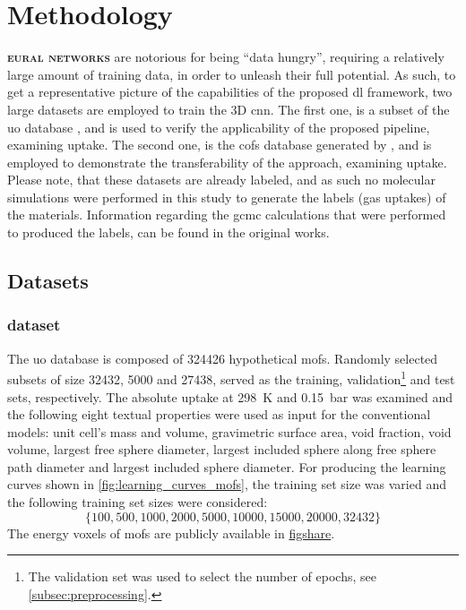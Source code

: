 \chapter{Methodology}

\lettrine[
	nindent=0em, findent=0.5em, loversize=-0.12, lines=5
]{}{\bfseries\color{Blue}eural networks} are
notorious for being ``data hungry'', requiring a relatively large amount of
training data, in order to unleash their full potential. As
such, to get a representative picture of the capabilities of the proposed
\gls{dl} framework, two large datasets are employed to train the
3D \gls{cnn}. The first one, is a subset of the \gls{uo} database \parencite{Boyd_2019}, and is used to verify the applicability of the
proposed pipeline, examining  uptake. The second one, is the \glspl{cof}
database generated by \parencite{Mercado_2018}, and is employed to demonstrate the
transferability of the approach, examining  uptake. Please note, that
these datasets are already labeled, and as such no molecular
simulations were performed in this study to
generate the labels (gas uptakes) of the
materials. Information regarding the \gls{gcmc} calculations that were performed
to produced the labels, can be found in the original works.

\section{Datasets}
\label{sec:datasets}

\subsection{ dataset}

The \gls{uo} database is composed of \num{324426} hypothetical
\glspl{mof}. Randomly selected subsets of size
\num{32432}, \num{5000} and \num{27438}, served as the training, validation\footnote{The validation set was used to
select the number of epochs, see \Section{} \ref{subsec:preprocessing}.} and test
sets, respectively. The absolute  uptake at
\SI{298}{\kelvin} and \SI{0.15}{\bar} was examined and the following eight
textual properties were used as input for the
conventional models: unit cell's mass and volume, gravimetric surface area, void
fraction, void volume, largest free sphere diameter, largest included sphere
along free sphere path diameter and largest included sphere diameter. For
producing the learning curves shown in \Figure{}
\ref{fig:learning_curves_mofs}, the training set size was varied and the following
training set sizes were considered:
\begin{equation}
	\{
		\num{100}, \num{500}, \num{1000},
		\num{2000}, \num{5000}, \num{10000},
		\num{15000}, \num{20000}, \num{32432}
	\}
\end{equation}
The energy voxels of \glspl{mof} are publicly available in
\href{https://figshare.com/articles/dataset/RetNet/24598845}{figshare}.

